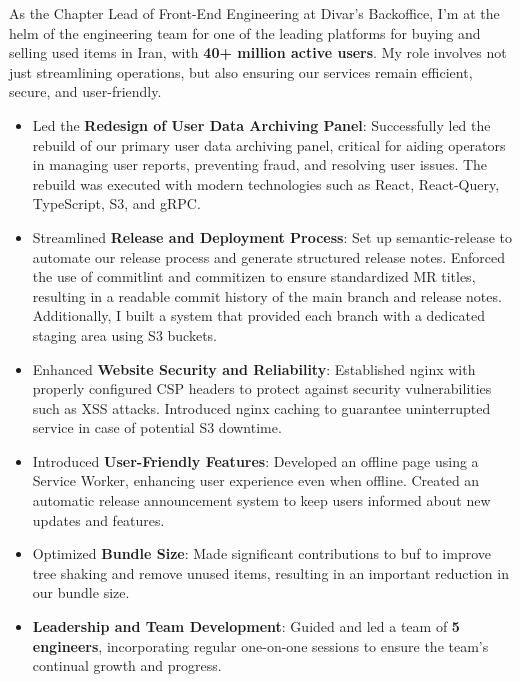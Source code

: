 As the Chapter Lead of Front-End Engineering at Divar's Backoffice, I'm at the helm of the engineering team for one of the leading platforms for buying and selling used items in Iran, with \textbf{40+ million active users}. My role involves not just streamlining operations, but also ensuring our services remain efficient, secure, and user-friendly.
\medskip
\begin{itemize}
    \item Led the \textbf{Redesign of User Data Archiving Panel}: Successfully led the rebuild of our primary user data archiving panel, critical for aiding operators in managing user reports, preventing fraud, and resolving user issues. The rebuild was executed with modern technologies such as React, React-Query, TypeScript, S3, and gRPC.
    \item Streamlined \textbf{Release and Deployment Process}: Set up semantic-release to automate our release process and generate structured release notes. Enforced the use of commitlint and commitizen to ensure standardized MR titles, resulting in a readable commit history of the main branch and release notes. Additionally, I built a system that provided each branch with a dedicated staging area using S3 buckets.
    \item Enhanced \textbf{Website Security and Reliability}: Established nginx with properly configured CSP headers to protect against security vulnerabilities such as XSS attacks. Introduced nginx caching to guarantee uninterrupted service in case of potential S3 downtime.
    \item Introduced \textbf{User-Friendly Features}: Developed an offline page using a Service Worker, enhancing user experience even when offline. Created an automatic release announcement system to keep users informed about new updates and features.
    \item Optimized \textbf{Bundle Size}: Made significant contributions to buf to improve tree shaking and remove unused items, resulting in an important reduction in our bundle size.
    \item \textbf{Leadership and Team Development}: Guided and led a team of \textbf{5 engineers}, incorporating regular one-on-one sessions to ensure the team's continual growth and progress.
\end{itemize}

\bigskip
\divider
\bigskip

